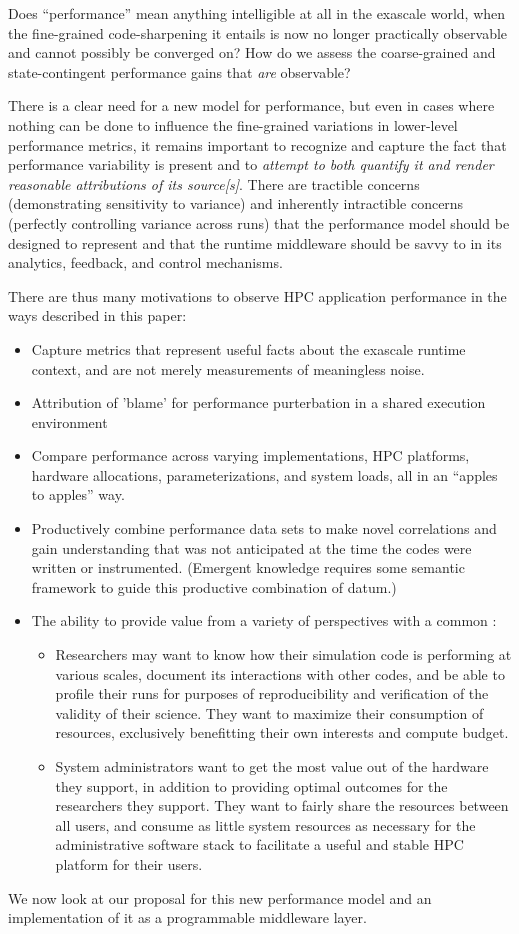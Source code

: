 Does ``performance'' mean anything intelligible at all in the exascale
world, when the fine-grained code-sharpening it entails is now no
longer practically observable and cannot possibly be converged on? How
do we assess the coarse-grained and state-contingent performance gains
that \textit{are} observable?

There is a clear need for a new model for performance, but even in
cases where nothing can be done to influence the fine-grained
variations in lower-level performance metrics, it remains important to
recognize and capture the fact that performance variability is present
and to \textit{attempt to both quantify it and render reasonable
attributions of its source[s]}. There are tractible concerns
(demonstrating sensitivity to variance) and inherently intractible
concerns (perfectly controlling variance across runs) that the
performance model should be designed to represent and that the runtime
middleware should be savvy to in its analytics, feedback, and control
mechanisms.

There are thus many motivations to observe HPC application performance
in the ways described in this paper:
\begin{itemize}
\item Capture metrics that represent useful facts about the exascale
runtime context, and are not merely measurements of meaningless noise.
\item Attribution of 'blame' for performance purterbation in a shared execution environment
\item Compare performance across varying implementations, HPC platforms,
      hardware allocations, parameterizations, and system loads, all in an
      ``apples to apples'' way.
\item Productively combine performance data sets to make novel correlations
      and gain understanding that was not anticipated at the time the
      codes were written or instrumented.  (Emergent knowledge requires
      some semantic framework to guide this productive combination of
      datum.)
\item The ability to provide value from a variety of perspectives with
      a common :
  \begin{itemize} \item Researchers may want to know how their
     simulation code is performing at various scales, document its
     interactions with other codes, and be able to profile their runs
     for purposes of reproducibility and verification of the validity
     of their science.  They want to maximize their consumption of
     resources, exclusively benefitting their own interests and
     compute budget.  \item System administrators want to get the most
     value out of the hardware they support, in addition to providing
     optimal outcomes for the researchers they support. They want to
     fairly share the resources between all users, and consume as
     little system resources as necessary for the administrative
     software stack to facilitate a useful and stable HPC platform for
     their users.  \end{itemize}
\end{itemize}

We now look at our proposal for this new performance model and an
implementation of it as a programmable middleware layer.




